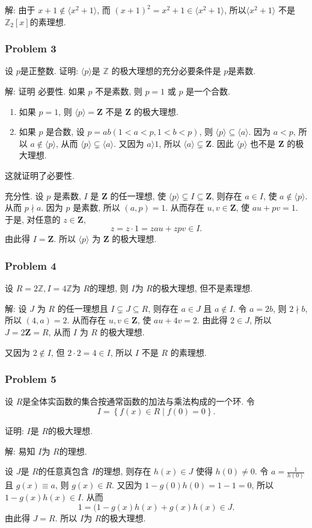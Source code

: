 \documentclass[a4paper,12pt]{ctexart}
\newcommand{\Z}{\mathbb{Z}}
\begin{document}
    解: 由于 $ x+1\notin \langle x^2+1\rangle $, 而 $ (x+1)^2=x^2+1\in\langle x^2+1\rangle $, 
    所以$ \langle x^2+1\rangle $ 不是 $ \Z_2[x] $的素理想.
\subsubsection*{Problem 3}
    设 $ p $是正整数. 证明: $ \langle p\rangle $是 $ \Z $ 的极大理想的充分必要条件是 $ p $是素数.

    解: 
    证明 必要性. 如果 $p$ 不是素数, 则 $p=1$ 或 $p$ 是一个合数.
    \begin{enumerate}[label=(\arabic{*})]
        \item  如果 $p=1$, 则 $\langle p\rangle=\mathbf{Z}$ 不是 $\mathbf{Z}$ 的极大理想.
        \item  如果 $p$ 是合数, 设 $p=a b(1<a<p, 1<b<p)$, 则 $\langle p\rangle \subseteq\langle a\rangle$. 因为 $a<p$, 所以 $a \notin\langle p\rangle$, 从而 $\langle p\rangle \subsetneq\langle a\rangle$. 又因为 $a\rangle 1$, 所以 $\langle a\rangle \subsetneq \mathbf{Z}$. 因此 $\langle p\rangle$ 也不是 $\mathbf{Z}$ 的极 大理想.
    \end{enumerate}
      这就证明了必要性.

      充分性. 设 $p$ 是素数, $I$ 是 $\mathbf{Z}$ 的任一理想, 使 $\langle p\rangle \subsetneq I \subseteq \mathbf{Z}$, 则存在 $a \in I$, 使 $a \notin\langle p\rangle$. 从而 $p \nmid a$. 因为 $p$ 是素数, 所以 $(a, p)=1$. 从而存在 $u, v \in \mathbf{Z}$, 使 $a u+p v=1$. 于是, 对任意的 $z \in \mathbf{Z}$,
      $$
      z=z \cdot 1=z a u+z p v \in I .
      $$
      由此得 $I=\mathbf{Z}$. 所以 $\langle p\rangle$ 为 $\mathbf{Z}$ 的极大理想.

\subsubsection*{Problem 4}
    设 $ R=2\Z,I=4\Z $为 $ R $的理想, 则 $ I $为 $ R $的极大理想, 但不是素理想. 

    解:  设 $J$ 为 $R$ 的任一理想且 $I \subsetneq J \subseteq R$, 则存在 $a \in J$ 且 $a \notin I$. 令 $a=2 b$, 则 $2 \nmid b$, 所以 $(4, a)=2$. 从而存在 $u, v \in \mathbf{Z}$, 使 $a u+4 v=2$. 由此得 $2 \in J$, 所以 $J=2 \mathbf{Z}=R$, 从而 $I$ 为 $R$ 的极大理想.

    又因为 $2 \notin I$, 但 $2 \cdot 2=4 \in I$, 所以 $I$ 不是 $R$ 的素理想.

\subsubsection*{Problem 5}
    设 $ R $是全体实函数的集合按通常函数的加法与乘法构成的一个环. 令 
    \[I=\left\{ f(x)\in R\middle|f(0)=0 \right\}.\]

    证明: $ I $是 $ R $的极大理想. 

    解: 易知 $ I $为 $ R $的理想.

    设 $ J $是 $ R $的任意真包含 $ I $的理想, 则存在 $ h(x)\in J $ 使得 $ h(0)\ne 0 $. 令 $ a=\frac{1}{h(0)} $且 $ g(x)\equiv a $, 
    则 $ g(x)\in R $. 又因为 $ 1-g(0)h(0)=1-1=0 $, 所以 $ 1-g(x)h(x)\in I $. 从而 
    \[1=(1-g(x)h(x)+g(x)h(x)\in J.\]
    由此得 $ J=R $. 所以 $ I $为 $ R $的极大理想.
\end{document}
